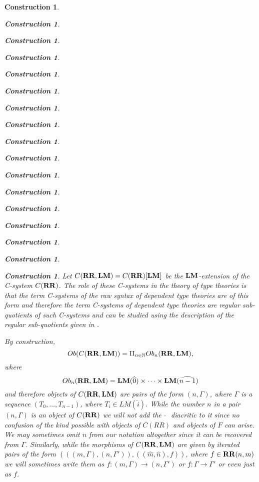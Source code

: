 \documentclass[12pt]{amsart}
\numberwithin{proposition}{subsection}
\newtheorem{construction}[proposition]{Construction}
\newcommand{\llabel}[1]{\label{#1}}
\newcommand{\sr}{\rightarrow}
\newcommand{\nn}{{\mathbb N}}
\newcommand{\nat}{\nn}
\newcommand{\wh}{\widehat}
\newcommand{\RR}{{\bf RR}}
\newcommand{\LM}{{\bf LM}}
\begin{document}
\begin{construction}
\begin{construction}
\begin{construction}
\begin{construction}
\begin{construction}
\begin{construction}
\begin{construction}
\begin{construction}
\begin{construction}
\begin{construction}
\begin{construction}
\begin{construction}
\begin{construction}
\begin{construction}
\begin{construction}
\begin{construction}
\begin{construction}
Let $C(\RR,\LM)=C(\RR)[\LM]$ be the $\LM$-extension of the C-system
$C(\RR)$. The role of these C-systems in the theory of type theories is that
the term C-systems of the raw syntax of dependent type theories are of this
form and therefore the term C-systems of dependent type theories are regular
sub-quotients of such C-systems and can be studied using the description of the
regular sub-quotients given in \cite{Csubsystems}.

By construction,
%
\begin{equation}\llabel{2016.01.21.eq3}
Ob(C(\RR,\LM))=\amalg_{n\in\nat}Ob_n(\RR,\LM),
\end{equation}%
%
where 
%
$$Ob_n(\RR,\LM)=\LM(\wh{0})\times\dots\times\LM(\wh{n-1})$$
%
and therefore objects of $C(\RR,\LM)$ are pairs of the form $(n,\Gamma)$, where
$\Gamma$ is a sequence $(T_0,\dots,T_{n-1})$, where $T_i\in LM(\wh{i})$. While
the number $n$ in a pair $(n,\Gamma)$ is an object of $C(\RR)$ we will not add
the ${\,\,\wh{}\,\,}$ diacritic to it since no confusion of the kind possible
with objects of $C(RR)$ and objects of $F$ can arise. We may sometimes omit $n$
from our notation altogether since it can be recovered from
$\Gamma$. Similarly, while the morphisms of $C(\RR,\LM)$ are given by iterated
pairs of the form $(((m,\Gamma),(n,\Gamma')),((\wh{m},\wh{n}),f))$, where $f\in
\RR(n,m)$ we will sometimes write them as $f:(m,\Gamma)\sr (n,\Gamma')$ or
$f:\Gamma\sr \Gamma'$ or even just as $f$.


\end{construction}
\end{construction}
\end{construction}
\end{construction}
\end{construction}
\end{construction}
\end{construction}
\end{construction}
\end{construction}
\end{construction}
\end{construction}
\end{construction}
\end{construction}
\end{construction}
\end{construction}
\end{construction}
\end{construction}
\end{document}
